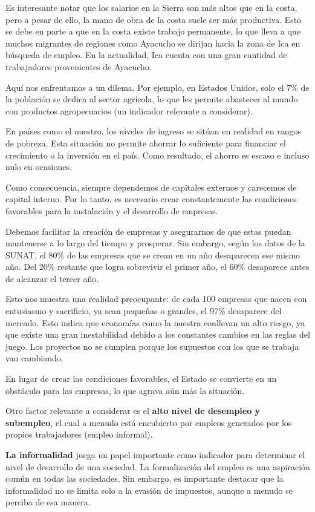 \documentclass[
  a4paper,
]{article}
\begin{document}
Es interesante notar que los salarios en la Sierra son más altos que en
la costa, pero a pesar de ello, la mano de obra de la costa suele ser
más productiva. Esto se debe en parte a que en la costa existe trabajo
permanente, lo que lleva a que muchos migrantes de regiones como
Ayacucho se dirijan hacia la zona de Ica en búsqueda de empleo. En la
actualidad, Ica cuenta con una gran cantidad de trabajadores
provenientes de Ayacucho.

Aquí nos enfrentamos a un dilema. Por ejemplo, en Estados Unidos, solo
el 7\% de la población se dedica al sector agrícola, lo que les permite
abastecer al mundo con productos agropecuarios (un indicador relevante a
considerar).

En países como el nuestro, los niveles de ingreso se sitúan en realidad
en rangos de pobreza. Esta situación no permite ahorrar lo suficiente
para financiar el crecimiento o la inversión en el país. Como resultado,
el ahorro es escaso e incluso nulo en ocasiones.

Como consecuencia, siempre dependemos de capitales externos y carecemos
de capital interno. Por lo tanto, es necesario crear constantemente las
condiciones favorables para la instalación y el desarrollo de empresas.

Debemos facilitar la creación de empresas y asegurarnos de que estas
puedan mantenerse a lo largo del tiempo y prosperar. Sin embargo, según
los datos de la SUNAT, el 80\% de las empresas que se crean en un año
desaparecen ese mismo año. Del 20\% restante que logra sobrevivir el
primer año, el 60\% desaparece antes de alcanzar el tercer año.

Esto nos muestra una realidad preocupante: de cada 100 empresas que
nacen con entusiasmo y sacrificio, ya sean pequeñas o grandes, el 97\%
desaparece del mercado. Esto indica que economías como la nuestra
conllevan un alto riesgo, ya que existe una gran inestabilidad debido a
los constantes cambios en las reglas del juego. Los proyectos no se
cumplen porque los supuestos con los que se trabaja van cambiando.

En lugar de crear las condiciones favorables, el Estado se convierte en
un obstáculo para las empresas, lo que agrava aún más la situación.

Otro factor relevante a considerar es el \textbf{alto nivel de desempleo
y subempleo}, el cual a menudo está encubierto por empleos generados por
los propios trabajadores (empleo informal).

\textbf{La informalidad} juega un papel importante como indicador para
determinar el nivel de desarrollo de una sociedad. La formalización del
empleo es una aspiración común en todas las sociedades. Sin embargo, es
importante destacar que la informalidad no se limita solo a la evasión
de impuestos, aunque a menudo se perciba de esa manera.
\end{document}
